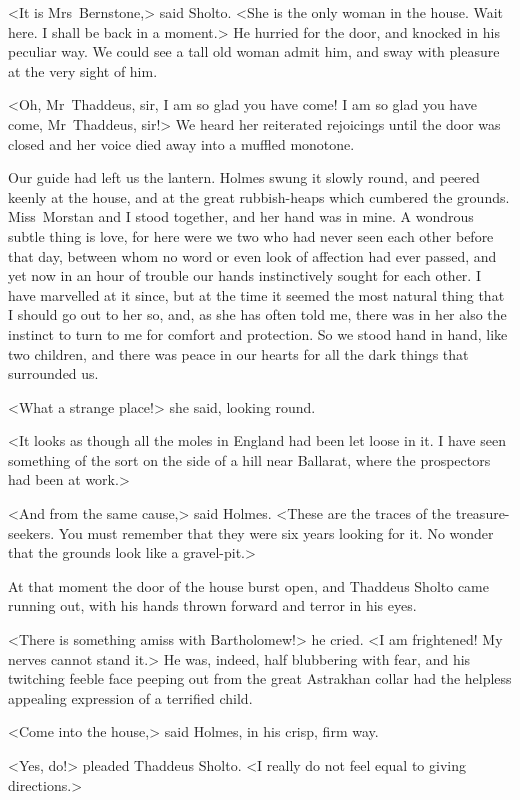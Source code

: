 <It is Mrs~Bernstone,> said Sholto. <She is the only woman in the house. Wait here. I shall be back in a moment.> He hurried for the door, and knocked in his peculiar way. We could see a tall old woman admit him, and sway with pleasure at the very sight of him.

<Oh, Mr~Thaddeus, sir, I am so glad you have come! I am so glad you have come, Mr~Thaddeus, sir!> We heard her reiterated rejoicings until the door was closed and her voice died away into a muffled monotone.

Our guide had left us the lantern. Holmes swung it slowly round, and peered keenly at the house, and at the great rubbish-heaps which cumbered the grounds. Miss~Morstan and I stood together, and her hand was in mine. A wondrous subtle thing is love, for here were we two who had never seen each other before that day, between whom no word or even look of affection had ever passed, and yet now in an hour of trouble our hands instinctively sought for each other. I have marvelled at it since, but at the time it seemed the most natural thing that I should go out to her so, and, as she has often told me, there was in her also the instinct to turn to me for comfort and protection. So we stood hand in hand, like two children, and there was peace in our hearts for all the dark things that surrounded us.

<What a strange place!> she said, looking round.

<It looks as though all the moles in England had been let loose in it. I have seen something of the sort on the side of a hill near Ballarat, where the prospectors had been at work.>

<And from the same cause,> said Holmes. <These are the traces of the treasure-seekers. You must remember that they were six years looking for it. No wonder that the grounds look like a gravel-pit.>

At that moment the door of the house burst open, and Thaddeus Sholto came running out, with his hands thrown forward and terror in his eyes.

<There is something amiss with Bartholomew!> he cried. <I am frightened! My nerves cannot stand it.> He was, indeed, half blubbering with fear, and his twitching feeble face peeping out from the great Astrakhan collar had the helpless appealing expression of a terrified child.

<Come into the house,> said Holmes, in his crisp, firm way.

<Yes, do!> pleaded Thaddeus Sholto. <I really do not feel equal to giving directions.>

